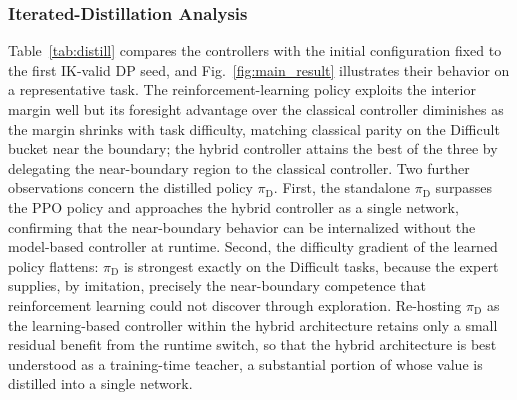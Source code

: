 \documentclass[journal, twoside]{IEEEtran}
\begin{document}
\subsubsection{Iterated-Distillation Analysis}\label{sec:distillresults}
Table~\ref{tab:distill} compares the controllers with the initial configuration fixed to the first IK-valid DP seed, and Fig.~\ref{fig:main_result} illustrates their behavior on a representative task. The reinforcement-learning policy exploits the interior margin well but its foresight advantage over the classical controller diminishes as the margin shrinks with task difficulty, matching classical parity on the Difficult bucket near the boundary; the hybrid controller attains the best of the three by delegating the near-boundary region to the classical controller. Two further observations concern the distilled policy $\pi_{\mathrm{D}}$. First, the standalone $\pi_{\mathrm{D}}$ surpasses the PPO policy and approaches the hybrid controller as a single network, confirming that the near-boundary behavior can be internalized without the model-based controller at runtime. Second, the difficulty gradient of the learned policy flattens: $\pi_{\mathrm{D}}$ is strongest exactly on the Difficult tasks, because the expert supplies, by imitation, precisely the near-boundary competence that reinforcement learning could not discover through exploration. Re-hosting $\pi_{\mathrm{D}}$ as the learning-based controller within the hybrid architecture retains only a small residual benefit from the runtime switch, so that the hybrid architecture is best understood as a training-time teacher, a substantial portion of whose value is distilled into a single network.
\end{document}
